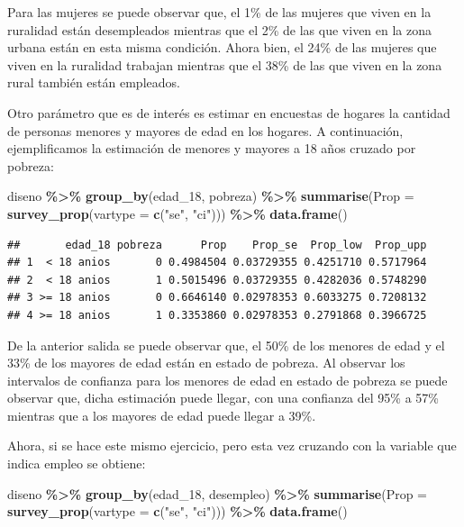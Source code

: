 \documentclass[
  12pt,
]{book}
\newenvironment{Shaded}{\begin{snugshade}}{\end{snugshade}}
\newcommand{\AttributeTok}[1]{\textcolor[rgb]{0.13,0.29,0.53}{#1}}
\newcommand{\FunctionTok}[1]{\textcolor[rgb]{0.13,0.29,0.53}{\textbf{#1}}}
\newcommand{\NormalTok}[1]{#1}
\newcommand{\SpecialCharTok}[1]{\textcolor[rgb]{0.81,0.36,0.00}{\textbf{#1}}}
\newcommand{\StringTok}[1]{\textcolor[rgb]{0.31,0.60,0.02}{#1}}
\begin{document}
Para las mujeres se puede observar que, el 1\% de las mujeres que viven en la ruralidad están desempleados mientras que el 2\% de las que viven en la zona urbana están en esta misma condición. Ahora bien, el 24\% de las mujeres que viven en la ruralidad trabajan mientras que el 38\% de las que viven en la zona rural también están empleados.

Otro parámetro que es de interés es estimar en encuestas de hogares la cantidad de personas menores y mayores de edad en los hogares. A continuación, ejemplificamos la estimación de menores y mayores a 18 años cruzado por pobreza:

\begin{Shaded}
\begin{Highlighting}[]
\NormalTok{diseno }\SpecialCharTok{\%\textgreater{}\%} \FunctionTok{group\_by}\NormalTok{(edad\_18, pobreza) }\SpecialCharTok{\%\textgreater{}\%} 
           \FunctionTok{summarise}\NormalTok{(}\AttributeTok{Prop =} \FunctionTok{survey\_prop}\NormalTok{(}\AttributeTok{vartype =}  \FunctionTok{c}\NormalTok{(}\StringTok{"se"}\NormalTok{, }\StringTok{"ci"}\NormalTok{))) }\SpecialCharTok{\%\textgreater{}\%}
           \FunctionTok{data.frame}\NormalTok{()}
\end{Highlighting}
\end{Shaded}

\begin{verbatim}
##       edad_18 pobreza      Prop    Prop_se  Prop_low  Prop_upp
## 1  < 18 anios       0 0.4984504 0.03729355 0.4251710 0.5717964
## 2  < 18 anios       1 0.5015496 0.03729355 0.4282036 0.5748290
## 3 >= 18 anios       0 0.6646140 0.02978353 0.6033275 0.7208132
## 4 >= 18 anios       1 0.3353860 0.02978353 0.2791868 0.3966725
\end{verbatim}

De la anterior salida se puede observar que, el 50\% de los menores de edad y el 33\% de los mayores de edad están en estado de pobreza. Al observar los intervalos de confianza para los menores de edad en estado de pobreza se puede observar que, dicha estimación puede llegar, con una confianza del 95\% a 57\% mientras que a los mayores de edad puede llegar a 39\%.

Ahora, si se hace este mismo ejercicio, pero esta vez cruzando con la variable que indica empleo se obtiene:

\begin{Shaded}
\begin{Highlighting}[]
\NormalTok{diseno }\SpecialCharTok{\%\textgreater{}\%} \FunctionTok{group\_by}\NormalTok{(edad\_18, desempleo) }\SpecialCharTok{\%\textgreater{}\%} 
           \FunctionTok{summarise}\NormalTok{(}\AttributeTok{Prop =} \FunctionTok{survey\_prop}\NormalTok{(}\AttributeTok{vartype =}  \FunctionTok{c}\NormalTok{(}\StringTok{"se"}\NormalTok{, }\StringTok{"ci"}\NormalTok{))) }\SpecialCharTok{\%\textgreater{}\%}
           \FunctionTok{data.frame}\NormalTok{()}
\end{Highlighting}
\end{Shaded}
\end{document}

